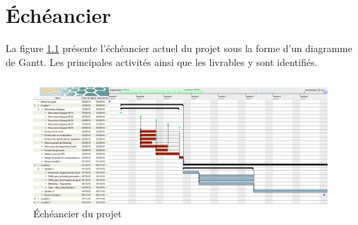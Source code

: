 \chapter{Échéancier}
\label{s:echeancier}

La figure \ref{fig:gantt} présente l'échéancier actuel du projet sous la forme d'un diagramme de Gantt. Les principales activités ainsi que les livrables y sont identifiés.

\begin{figure}[p]
	\centering
	\includegraphics[scale=0.35, angle=90]{fig/gantt.png}
	\caption{Échéancier du projet}
	\label{fig:gantt}
\end{figure}